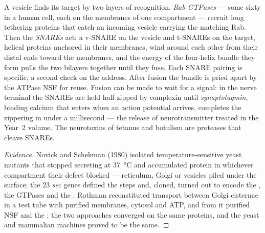 \begin{definition}\label{def:b3:membrane-traffic:fusion}
A vesicle finds its target by two layers of recognition. \emph{Rab
GTPases} --- some sixty in a human cell, each on the membranes of one
compartment --- recruit long tethering proteins that catch an incoming
vesicle carrying the matching Rab. Then the \emph{SNAREs} act: a
v-SNARE on the vesicle and t-SNAREs on the target, helical proteins
anchored in their membranes, wind around each other from their distal
ends toward the membranes, and the energy of the four-helix bundle they
form pulls the two bilayers together until they fuse. Each SNARE pairing
is specific, a second check on the address. After fusion the bundle
is pried apart by the ATPase NSF for reuse. Fusion can be made to wait
for a signal: in the nerve terminal the SNAREs are held half-zipped by
complexin until \emph{synaptotagmin}, binding calcium that enters when
an action potential arrives, completes the zippering in under a
millisecond --- the release of neurotransmitter treated in the Year~2
volume. The neurotoxins of tetanus and botulism are proteases that
cleave SNAREs.
\end{definition}

\begin{proof}[Evidence]
Novick and Schekman (1980) isolated temperature-sensitive yeast
mutants that stopped secreting at \qty{37}{\celsius} and accumulated
protein in whichever compartment their defect blocked --- reticulum,
Golgi or vesicles piled under the surface; the $23$ \emph{sec} genes
defined the steps and, cloned, turned out to encode the , the
GTPases and the . Rothman reconstituted transport between Golgi
cisternae in a test tube with purified membranes, cytosol and ATP,
and from it purified NSF and the ; the two approaches converged
on the same proteins, and the yeast and mammalian machines proved to be
the same.
\end{proof}

